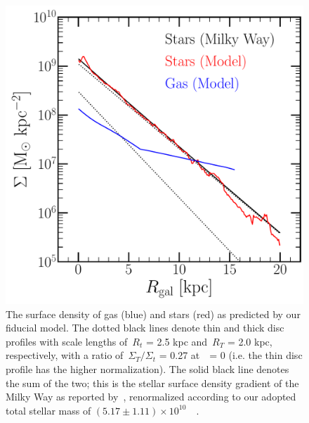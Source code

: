 \documentclass[draft2.tex]{subfiles}
\begin{document}
\begin{figure} 
\centering 
\includegraphics[scale = 0.45]{surface_density_gradient.pdf} 
\caption{The surface density of gas (blue) and stars (red) as predicted by our 
fiducial model. The dotted black lines denote thin and thick disc 
profiles with scale lengths of~$R_t$ = 2.5 kpc and~$R_T$ = 2.0 kpc, 
respectively, with a ratio of~$\Sigma_T/\Sigma_t$ = 0.27 at~\rgal~= 0 (i.e. the 
thin disc profile has the higher normalization). 
The solid black line denotes the sum of the two; this is the stellar surface 
density gradient of the Milky Way as reported by~\citet{Bland-Hawthorn2016}, 
renormalized according to our adopted total stellar mass of 
$(5.17 \pm 1.11)\times10^{10}$~\msun~\citep{Licquia2015}. } 
\label{fig:surface_density} 
\end{figure} 
\end{document}
